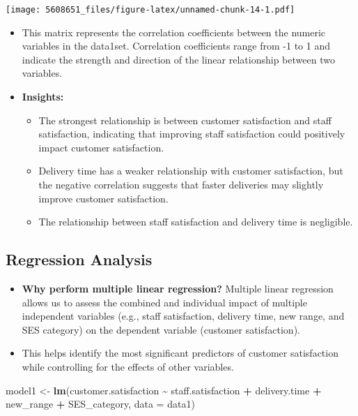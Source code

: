 \documentclass[
]{article}
\newenvironment{Shaded}{\begin{snugshade}}{\end{snugshade}}
\newcommand{\AttributeTok}[1]{\textcolor[rgb]{0.13,0.29,0.53}{#1}}
\newcommand{\FunctionTok}[1]{\textcolor[rgb]{0.13,0.29,0.53}{\textbf{#1}}}
\newcommand{\NormalTok}[1]{#1}
\newcommand{\OtherTok}[1]{\textcolor[rgb]{0.56,0.35,0.01}{#1}}
\newcommand{\SpecialCharTok}[1]{\textcolor[rgb]{0.81,0.36,0.00}{\textbf{#1}}}
\providecommand{\tightlist}{%
  \setlength{\itemsep}{0pt}\setlength{\parskip}{0pt}}
\begin{document}
\texttt{[image: 5608651\_files/figure-latex/unnamed-chunk-14-1.pdf]}

\begin{itemize}
\item
  This matrix represents the correlation coefficients between the
  numeric variables in the data1set. Correlation coefficients range from
  -1 to 1 and indicate the strength and direction of the linear
  relationship between two variables.
\item
  \textbf{Insights:}

  \begin{itemize}
  \tightlist
  \item
    The strongest relationship is between customer satisfaction and
    staff satisfaction, indicating that improving staff satisfaction
    could positively impact customer satisfaction.
  \item
    Delivery time has a weaker relationship with customer satisfaction,
    but the negative correlation suggests that faster deliveries may
    slightly improve customer satisfaction.
  \item
    The relationship between staff satisfaction and delivery time is
    negligible.
  \end{itemize}
\end{itemize}

\subsection{Regression Analysis}\label{regression-analysis-1}

\begin{itemize}
\tightlist
\item
  \textbf{Why perform multiple linear regression?} Multiple linear
  regression allows us to assess the combined and individual impact of
  multiple independent variables (e.g., staff satisfaction, delivery
  time, new range, and SES category) on the dependent variable (customer
  satisfaction).
\item
  This helps identify the most significant predictors of customer
  satisfaction while controlling for the effects of other variables.
\end{itemize}

\begin{Shaded}
\begin{Highlighting}[]
\NormalTok{model1 }\OtherTok{\textless{}{-}} \FunctionTok{lm}\NormalTok{(customer.satisfaction }\SpecialCharTok{\textasciitilde{}}\NormalTok{ staff.satisfaction }\SpecialCharTok{+}\NormalTok{ delivery.time }\SpecialCharTok{+}\NormalTok{ new\_range }\SpecialCharTok{+}\NormalTok{ SES\_category, }\AttributeTok{data =}\NormalTok{ data1)}
\end{Highlighting}
\end{Shaded}
\end{document}
